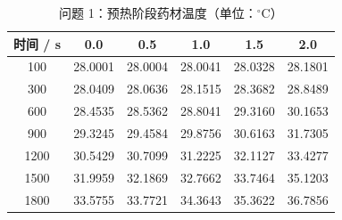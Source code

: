 \begin{table}[htbp]
\centering
\caption{问题 1：预热阶段药材温度（单位：$^\circ$C）}
\label{table_01_p1_temperature}
\begin{tabular}{cccccc}
\toprule
时间 / s & 0.0 & 0.5 & 1.0 & 1.5 & 2.0 \\
\midrule
100 & 28.0001 & 28.0004 & 28.0041 & 28.0328 & 28.1801 \\
300 & 28.0409 & 28.0636 & 28.1515 & 28.3682 & 28.8489 \\
600 & 28.4535 & 28.5362 & 28.8041 & 29.3160 & 30.1653 \\
900 & 29.3245 & 29.4584 & 29.8756 & 30.6163 & 31.7305 \\
1200 & 30.5429 & 30.7099 & 31.2225 & 32.1127 & 33.4277 \\
1500 & 31.9959 & 32.1869 & 32.7662 & 33.7464 & 35.1203 \\
1800 & 33.5755 & 33.7721 & 34.3643 & 35.3622 & 36.7856 \\
\bottomrule
\end{tabular}
\end{table}
